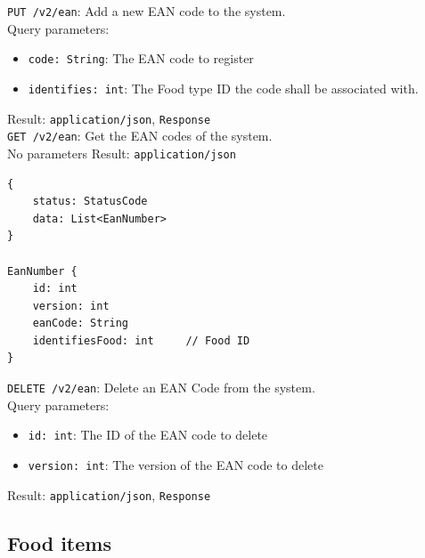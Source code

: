\documentclass[12pt]{report}
\begin{document}
\texttt{PUT /v2/ean}: Add a new EAN code to the system.\\
Query parameters:
\begin{itemize}
\item \texttt{code: String}: The EAN code to register
\item \texttt{identifies: int}: The Food type ID the code shall be associated
with.
\end{itemize}
Result: \texttt{application/json}, \texttt{Response}\vspace{7mm}\\
\texttt{GET /v2/ean}: Get the EAN codes of the system.\\
No parameters
Result: \texttt{application/json}
\begin{lstlisting}
{
    status: StatusCode
    data: List<EanNumber>
}

EanNumber {
    id: int
    version: int
    eanCode: String
    identifiesFood: int	    // Food ID
}
\end{lstlisting}
\texttt{DELETE /v2/ean}: Delete an EAN Code from the system.\\
Query parameters:
\begin{itemize}
\item \texttt{id: int}: The ID of the EAN code to delete
\item \texttt{version: int}: The version of the EAN code to delete
\end{itemize}
Result: \texttt{application/json}, \texttt{Response}\vspace{7mm}\\

\subsection{Food items}
\end{document}
